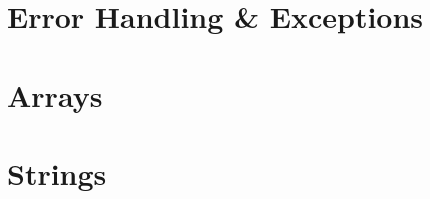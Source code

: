 \documentclass[12pt]{scrbook}
\begin{document}
\chapter{Error Handling \& Exceptions}
\label{chapter:php:errorHandling}


\chapter{Arrays}
\label{chapter:php:arrays}


\chapter{Strings}
\label{chapter:php:strings}


\backmatter

\newpage
\printglossaries
\forallglsentries{\thislabel}%
{%
  \ifglsused{\thislabel}{}{\glsadd[format=ignore]{\thislabel}}%
}

{}
\printindex
{}

{}
\nocite{*}

%

\end{document}
